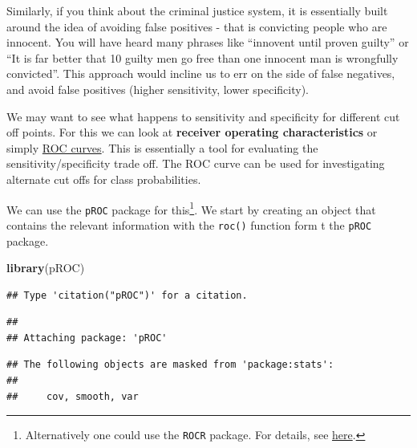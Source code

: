 \documentclass[]{book}
\newenvironment{Shaded}{\begin{snugshade}}{\end{snugshade}}
\newcommand{\DataTypeTok}[1]{\textcolor[rgb]{0.13,0.29,0.53}{#1}}
\newcommand{\DecValTok}[1]{\textcolor[rgb]{0.00,0.00,0.81}{#1}}
\newcommand{\KeywordTok}[1]{\textcolor[rgb]{0.13,0.29,0.53}{\textbf{#1}}}
\newcommand{\NormalTok}[1]{#1}
\newcommand{\OperatorTok}[1]{\textcolor[rgb]{0.81,0.36,0.00}{\textbf{#1}}}
\newcommand{\StringTok}[1]{\textcolor[rgb]{0.31,0.60,0.02}{#1}}
\let\rmarkdownfootnote\footnote%
\def\footnote{\protect\rmarkdownfootnote}
\theoremstyle{definition}
\theoremstyle{definition}
\theoremstyle{definition}
\theoremstyle{remark}
\begin{document}
Similarly, if you think about the criminal justice system, it is
essentially built around the idea of avoiding false positives - that is
convicting people who are innocent. You will have heard many phrases
like ``innovent until proven guilty'' or ``It is far better that 10
guilty men go free than one innocent man is wrongfully convicted''. This
approach would incline us to err on the side of false negatives, and
avoid false positives (higher sensitivity, lower specificity).

We may want to see what happens to sensitivity and specificity for
different cut off points. For this we can look at \textbf{receiver
operating characteristics} or simply
\href{http://en.wikipedia.org/wiki/Receiver_operating_characteristic}{ROC
curves}. This is essentially a tool for evaluating the
sensitivity/specificity trade off. The ROC curve can be used for
investigating alternate cut offs for class probabilities.

We can use the \texttt{pROC} package for this\footnote{Alternatively one
  could use the \texttt{ROCR} package. For details, see
  \href{http://rocr.bioinf.mpi-sb.mpg.de/}{here}.}. We start by creating
an object that contains the relevant information with the \texttt{roc()}
function form t the \texttt{pROC} package.

\begin{Shaded}
\begin{Highlighting}[]
\KeywordTok{library}\NormalTok{(pROC)}
\end{Highlighting}
\end{Shaded}

\begin{verbatim}
## Type 'citation("pROC")' for a citation.
\end{verbatim}

\begin{verbatim}
## 
## Attaching package: 'pROC'
\end{verbatim}

\begin{verbatim}
## The following objects are masked from 'package:stats':
## 
##     cov, smooth, var
\end{verbatim}

\begin{Shaded}
\end{Shaded}
\end{document}
